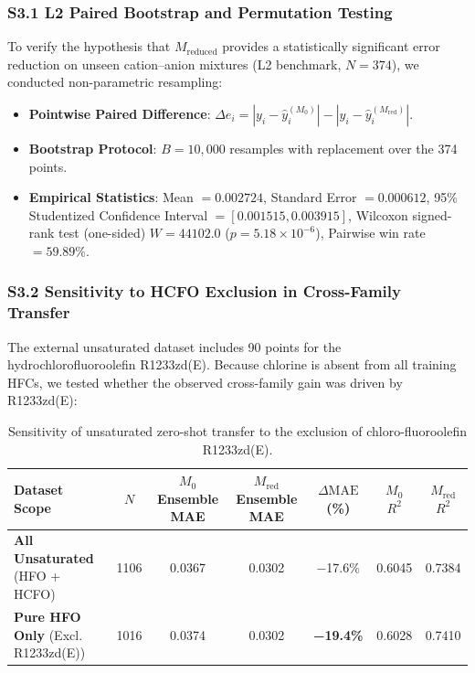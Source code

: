 \subsubsection*{S3.1 L2 Paired Bootstrap and Permutation Testing}
To verify the hypothesis that $M_{\mathrm{reduced}}$ provides a statistically significant error reduction on unseen cation--anion mixtures (L2 benchmark, $N=374$), we conducted non-parametric resampling:
\begin{itemize}
    \item \textbf{Pointwise Paired Difference}: $\Delta e_i = |y_i - \hat{y}_i^{(M_0)}| - |y_i - \hat{y}_i^{(M_{\mathrm{red}})}|$.
    \item \textbf{Bootstrap Protocol}: $B = 10,000$ resamples with replacement over the 374 points.
    \item \textbf{Empirical Statistics}: Mean $= 0.002724$, Standard Error $= 0.000612$, 95\% Studentized Confidence Interval $= [0.001515, 0.003915]$, Wilcoxon signed-rank test (one-sided) $W = 44102.0$ ($p = 5.18 \times 10^{-6}$), Pairwise win rate $= 59.89\%$.
\end{itemize}

\subsubsection*{S3.2 Sensitivity to HCFO Exclusion in Cross-Family Transfer}
The external unsaturated dataset includes 90 points for the hydrochlorofluoroolefin R1233zd(E). Because chlorine is absent from all training HFCs, we tested whether the observed cross-family gain was driven by R1233zd(E):

\begin{table}[htbp]
\centering
\small
\caption{Sensitivity of unsaturated zero-shot transfer to the exclusion of chloro-fluoroolefin R1233zd(E).}
\label{tab:si_hcfo_sensitivity}
\begin{tabular}{lcccccc}
\toprule
\textbf{Dataset Scope} & \textbf{$N$} & \textbf{$M_0$ Ensemble MAE} & \textbf{$M_{\mathrm{red}}$ Ensemble MAE} & \textbf{$\Delta\text{MAE}$ (\%)} & \textbf{$M_0$ $R^2$} & \textbf{$M_{\mathrm{red}}$ $R^2$} \\
\midrule
\textbf{All Unsaturated} (HFO + HCFO) & 1106 & 0.0367 & 0.0302 & −17.6\% & 0.6045 & 0.7384 \\
\textbf{Pure HFO Only} (Excl. R1233zd(E)) & 1016 & 0.0374 & 0.0302 & \textbf{−19.4\%} & 0.6028 & 0.7410 \\
\bottomrule
\end{tabular}
\end{table}

